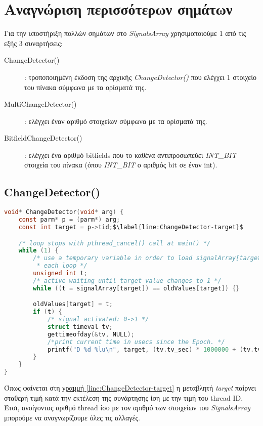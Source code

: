 \chapter{Αναγνώριση περισσότερων σημάτων}

Για την υποστήριξη πολλών σημάτων στο \textit{SignalsArray} χρησιμοποιούμε 1 από 
τις εξής 3 συναρτήσεις:
\begin{description}
	\item[ChangeDetector()]: τροποποιημένη έκδοση της αρχικής 
	\textit{ChangeDetector()} που ελέγχει 1 στοιχείο του πίνακα σύμφωνα με τα 
	ορίσματά της.
	\item[MultiChangeDetector()]: ελέγχει έναν αριθμό στοιχείων σύμφωνα με τα 
	ορίσματά της.
	\item[BitfieldChangeDetector()]: ελέγχει ένα αριθμό bitfields που το καθένα 
	αντιπροσωπεύει \textit{INT\_BIT} στοιχεία του πίνακα (όπου \textit{INT\_BIT} 
	ο 
	αριθμός bit σε έναν int).
\end{description}

\section{ChangeDetector()}

\begin{lstlisting}[language=c, caption={ChangeDetector()}, escapechar=$]
void* ChangeDetector(void* arg) {
    const parm* p = (parm*) arg;
    const int target = p->tid;$\label{line:ChangeDetector-target}$

    /* loop stops with pthread_cancel() call at main() */
    while (1) {
        /* use a temporary variable in order to load signalArray[target] once in
         * each loop */
        unsigned int t;
        /* active waiting until target value changes to 1 */
        while ((t = signalArray[target]) == oldValues[target]) {}

        oldValues[target] = t;
        if (t) {
            /* signal activated: 0->1 */
            struct timeval tv;
            gettimeofday(&tv, NULL);
            /*print current time in usecs since the Epoch. */
            printf("D %d %lu\n", target, (tv.tv_sec) * 1000000 + (tv.tv_usec));
        }
    }
}
\end{lstlisting}

Όπως φαίνεται στη \hyperref[line:ChangeDetector-target]{γραμμή 
\ref*{line:ChangeDetector-target}} η μεταβλητή \textit{target} παίρνει σταθερή 
τιμή κατά την εκτέλεση της συνάρτησης ίση με την τιμή του thread ID. Έτσι, 
ανοίγοντας αριθμό thread ίσο με τον αριθμό των στοιχείων του 
\textit{SignalsArray} μπορούμε να αναγνωρίζουμε όλες τις αλλαγές.

